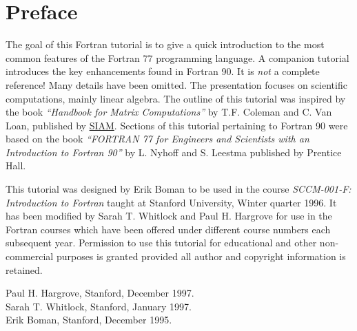 \section{Preface}

The goal of this Fortran tutorial is to give a quick introduction to the
most common features of the Fortran 77 programming language. A companion
tutorial introduces the key enhancements found in Fortran 90. It is
\textit{not} a complete reference! Many details have been omitted. The
presentation focuses on scientific computations, mainly linear algebra.
The outline of this tutorial was inspired by the book \textit{``Handbook
for Matrix Computations''} by T.F. Coleman and C. Van Loan, published by
\href{http://www.siam.org/}{SIAM}. Sections of this tutorial pertaining
to Fortran 90 were based on the book \textit{``FORTRAN 77 for Engineers
and Scientists with an Introduction to Fortran 90''} by L. Nyhoff and S.
Leestma published by Prentice Hall.

This tutorial was designed by Erik Boman to be used in the course
\textit{SCCM-001-F: Introduction to Fortran} taught at Stanford
University, Winter quarter 1996. It has been modified by Sarah T.
Whitlock and Paul H. Hargrove for use in the Fortran courses which have
been offered under different course numbers each subsequent year.
Permission to use this tutorial for educational and other non-commercial
purposes is granted provided all author and copyright information is
retained.

Paul H. Hargrove, Stanford, December 1997. \\
Sarah T. Whitlock, Stanford, January 1997. \\
Erik Boman, Stanford, December 1995.
